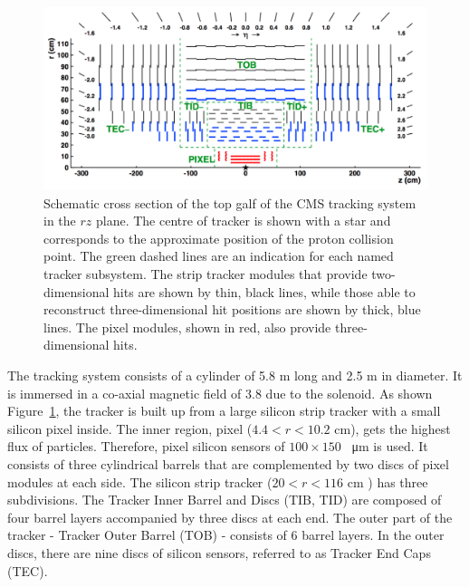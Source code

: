 \begin{figure}[ht]
	\centering
	\includegraphics[width=\textwidth]{2_ExperimentalSetup/Figures/imageedit_11_9317262269}
  \caption{Schematic cross section of the top galf of the CMS tracking system in the $rz$ plane. The centre of tracker is shown with a star and corresponds to the approximate position of the proton collision point. The green dashed lines are an indication for each named tracker subsystem. The strip tracker modules that provide two-dimensional hits are shown by thin, black lines, while those able to reconstruct three-dimensional hit positions are shown by thick, blue lines. The pixel modules, shown in red, also provide three-dimensional hits.  }
	\label{fig:Tracker}
\end{figure}

 The tracking system consists of a cylinder of 5.8 \si{ \meter} long and 2.5 \si{ \meter} in diameter. It is immersed in a co-axial magnetic field of 3.8 \si{ \Tesla} due to the solenoid.
 As shown Figure~\ref{fig:Tracker}, the tracker is built up from a large silicon strip tracker with a small silicon pixel inside. 
 The inner region, pixel ($4.4<r<10.2$ \si{ \cm}), gets the highest flux of particles. Therefore, pixel silicon sensors of $100 \times 150$ \si{ \squared \micro \meter} is used. It consists of three cylindrical barrels that are complemented by two discs of pixel modules at each side.
 The silicon strip tracker ($20<r<116$ \si{ \cm} ) has three subdivisions. The Tracker Inner Barrel  and Discs (TIB, TID) are composed of four barrel layers accompanied by three discs at each end. The outer part of the tracker - Tracker Outer Barrel (TOB) -  consists  of 6 barrel layers. In the outer discs, there are nine discs of silicon sensors, referred to as Tracker End Caps (TEC). 
  
